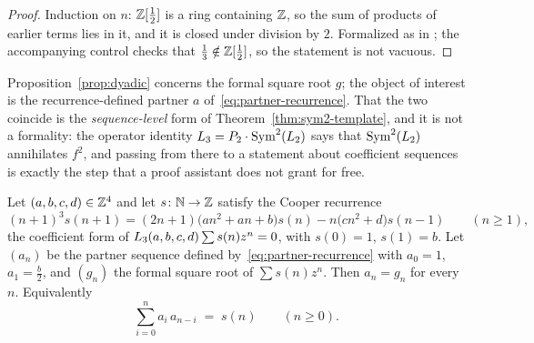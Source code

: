 \begin{proof}
Induction on $n$: $\mathbb{Z}[\tfrac12]$ is a ring containing $\mathbb{Z}$, so the sum of
products of earlier terms lies in it, and it is closed under division by $2$.
Formalized as  in
; the accompanying control
 checks that $\tfrac13\notin\mathbb{Z}[\tfrac12]$,
so the statement is not vacuous.
\end{proof}

Proposition~\ref{prop:dyadic} concerns the formal square root $g$; the object
of interest is the recurrence-defined partner $a$
of~\eqref{eq:partner-recurrence}. That the two coincide is the
\emph{sequence-level} form of Theorem~\ref{thm:sym2-template}, and it is not a
formality: the operator identity $L_3 = P_2\cdot\operatorname{Sym}^2(L_2)$ says that
$\operatorname{Sym}^2(L_2)$ annihilates $f^2$, and passing from there to a statement
about coefficient sequences is exactly the step that a proof assistant does
not grant for free.

\begin{theorem}\label{thm:bridge}
Let $(a,b,c,d)\in\mathbb{Z}^4$ and let $s\colon\mathbb N\to\mathbb{Z}$ satisfy the Cooper
recurrence
\begin{equation}\label{eq:cooper-recurrence}
  (n+1)^3 s(n+1) = (2n+1)\bigl(an^2+an+b\bigr)s(n) - n\bigl(cn^2+d\bigr)s(n-1)
  \qquad(n\geq1),
\end{equation}
the coefficient form of $L_3(a,b,c,d)\sum s(n)z^n=0$, with $s(0)=1$,
$s(1)=b$. Let $(a_n)$ be
the partner sequence defined by~\eqref{eq:partner-recurrence} with $a_0=1$,
$a_1=\tfrac b2$, and $(g_n)$ the formal square root of $\sum s(n)z^n$. Then
$a_n = g_n$ for every $n$. Equivalently
\[
  \sum_{i=0}^{n} a_i\,a_{n-i} \;=\; s(n)\qquad(n\geq 0).
\]
\end{theorem}

